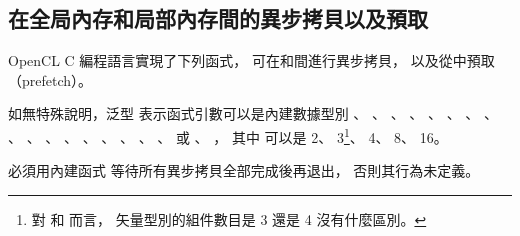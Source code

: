\subsection[sec:asyncCopyPrefetch]{在全局內存和局部內存間的異步拷貝以及預取}

OpenCL C 編程語言實現了下列函式，
可在和間進行異步拷貝，
以及從中預取（prefetch）。

如無特殊說明，泛型  表示函式引數可以是內建數據型別
 、 、 、 、
 、 、 、 、
 、 、 、 、
 、 、 、 、
 、  或 、 ，
其中  可以是 2、 3\footnote{
對  和  而言，
矢量型別的組件數目是 3 還是 4 沒有什麼區別。}、 4、 8、 16。

{}

\startnotepar
{}必須用內建函式  等待所有異步拷貝全部完成後再退出，
否則其行為未定義。
\stopnotepar

